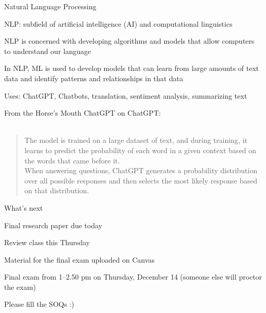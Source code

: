 \documentclass{./../div_teaching_slides}
\begin{document}
\begin{frame}{Natural Language Processing}
\begin{witemize}
  \item NLP: subfield of artificial intelligence (AI) and computational linguistics
  \item NLP is concerned with developing algorithms and models that allow computers to understand our language
  \item In NLP, ML is used to develop models that can learn from large amounts of text data and identify patterns and relationships in that data
  \item Uses: ChatGPT, Chatbots, translation, sentiment analysis, summarizing text
\end{witemize}
\end{frame}

\begin{frame}{From the Horse's Mouth}
ChatGPT on ChatGPT: \\~\\
\begin{quote}
The model is trained on a large dataset of text, and during training, it learns to predict the probability of each word in a given context based on the words that came before it. \\ \vspace{0.5em}
When answering questions, ChatGPT generates a probability distribution over all possible responses and then selects the most likely response based on that distribution. 
\end{quote}
\end{frame}

\begin{frame}{What's next}
\begin{witemize}
  \item Final research paper due today
  \item Review class this Thursday 
  \item Material for the final exam uploaded on Canvas
  \item Final exam from 1--2.50 pm on Thursday, December 14 (someone else will proctor the exam)
  \item Please fill the SOQs :)
\end{witemize}

\end{frame}
\end{document}
